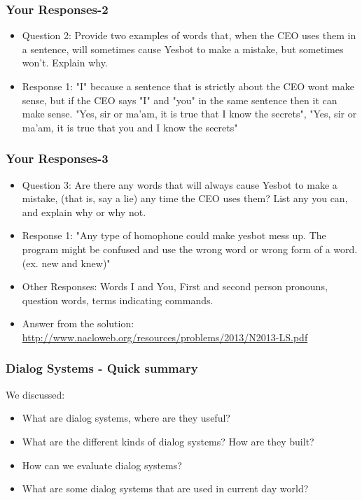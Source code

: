\documentclass{beamer}
\begin{document}
\begin{frame}
\frametitle{Your Responses-2}
\begin{itemize}
\item Question 2: Provide two examples of words that, when the CEO uses them in a sentence, will sometimes cause
Yesbot to make a mistake, but sometimes won’t. Explain why.
\item Response 1: "I" because a sentence that is strictly about the CEO wont make sense, but if the CEO says "I" and "you" in the same       sentence then it can make sense. "Yes, sir or ma'am, it is true that I know the secrets", "Yes, sir or ma'am, it is true that you and I know the secrets"
\end{itemize}
\end{frame}

\begin{frame}
\frametitle{Your Responses-3}
\begin{itemize}
\item Question 3: Are there any words that will always cause Yesbot to make a mistake, (that is, say a lie) any time the
CEO uses them? List any you can, and explain why or why not. 
\item Response 1: "Any type of homophone could make yesbot mess up. The program might be confused and use the wrong word or wrong form of a word. (ex. new and knew)"
\item Other Responses: Words I and You, First and second person pronouns, question words, terms indicating commands. 
\item Answer from the solution: \url{http://www.nacloweb.org/resources/problems/2013/N2013-LS.pdf}
\end{itemize}
\end{frame}

\begin{frame}
\frametitle{Dialog Systems - Quick summary}
We discussed:
\begin{itemize}
\item What are dialog systems, where are they useful? 
\item What are the different kinds of dialog systems? How are they built?
\item How can we evaluate dialog systems?
\item What are some dialog systems that are used in current day world?
\end{itemize}
\end{frame}
\end{document}
